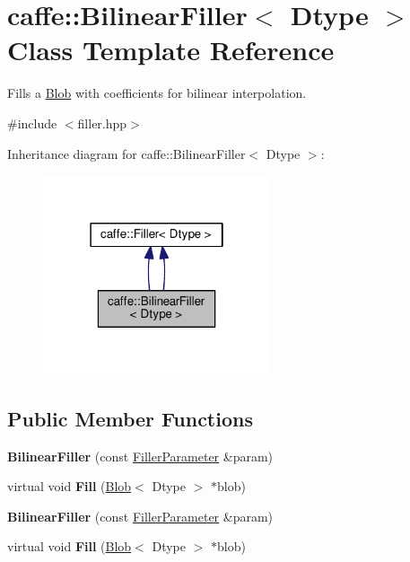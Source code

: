 \hypertarget{classcaffe_1_1_bilinear_filler}{}\section{caffe\+:\+:Bilinear\+Filler$<$ Dtype $>$ Class Template Reference}
\label{classcaffe_1_1_bilinear_filler}


Fills a \mbox{\hyperlink{classcaffe_1_1_blob}{Blob}} with coefficients for bilinear interpolation.  




{\ttfamily \#include $<$filler.\+hpp$>$}



Inheritance diagram for caffe\+:\+:Bilinear\+Filler$<$ Dtype $>$\+:
\nopagebreak
\begin{figure}[H]
\begin{center}
\leavevmode
\includegraphics[width=190pt]{classcaffe_1_1_bilinear_filler__inherit__graph}
\end{center}
\end{figure}
\subsection*{Public Member Functions}
\begin{DoxyCompactItemize}
\item 
\mbox{\label{classcaffe_1_1_bilinear_filler_a5052dabfcc0ba4d5e1514d4e397e21b4}} 
{\bfseries Bilinear\+Filler} (const \mbox{\hyperlink{classcaffe_1_1_filler_parameter}{Filler\+Parameter}} \&param)
\item 
\mbox{\label{classcaffe_1_1_bilinear_filler_a53ddc6c22c21476b9411463b3317418a}} 
virtual void {\bfseries Fill} (\mbox{\hyperlink{classcaffe_1_1_blob}{Blob}}$<$ Dtype $>$ $\ast$blob)
\item 
\mbox{\label{classcaffe_1_1_bilinear_filler_a5052dabfcc0ba4d5e1514d4e397e21b4}} 
{\bfseries Bilinear\+Filler} (const \mbox{\hyperlink{classcaffe_1_1_filler_parameter}{Filler\+Parameter}} \&param)
\item 
\mbox{\label{classcaffe_1_1_bilinear_filler_a53ddc6c22c21476b9411463b3317418a}} 
virtual void {\bfseries Fill} (\mbox{\hyperlink{classcaffe_1_1_blob}{Blob}}$<$ Dtype $>$ $\ast$blob)
\end{DoxyCompactItemize}
